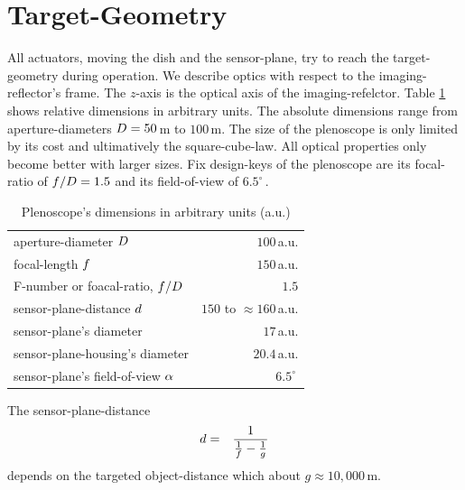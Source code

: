 \documentclass[11pt,a4paper,oneside,titlepage]{article}
\begin{document}
\section{Target-Geometry}
%
All actuators, moving the dish and the sensor-plane, try to reach the target-geometry during operation.
%
We describe optics with respect to the imaging-reflector's frame.
%
The $z$-axis is the optical axis of the imaging-refelctor.
%
Table \ref{TabBasicDimensions} shows relative dimensions in arbitrary units.
%
The absolute dimensions range from aperture-diameters $D = 50\,$m to $100\,$m.
%
The size of the plenoscope is only limited by its cost and ultimatively the square-cube-law.
%
All optical properties only become better with larger sizes.
%
Fix design-keys of the plenoscope are its focal-ratio of $f/D = 1.5$ and its field-of-view of $6.5^\circ\,$.
%
\begin{table}[H]
    \begin{center}
        \begin{tabular}{lr}
            \toprule
            aperture-diameter $D$ & $100\,$a.u.\\
            focal-length $f$ & $150\,$a.u.\\
            F-number or foacal-ratio, $f/D$ & $1.5$\\
            sensor-plane-distance $d$ & $150$ to $\approx 160\,$a.u.\\
            sensor-plane's diameter & $17\,$a.u.\\
            sensor-plane-housing's diameter & $20.4\,$a.u.\\
            sensor-plane's field-of-view $\alpha$ & $6.5^\circ\,$\\
            \bottomrule
        \end{tabular}
        \caption[]{Plenoscope's dimensions in arbitrary units (a.u.)}
        \label{TabBasicDimensions}
    \end{center}
\end{table}
%
The sensor-plane-distance
%
\begin{eqnarray}
d &=& \frac{1}{\frac{1}{f} - \frac{1}{g}}
\end{eqnarray}
%
depends on the targeted object-distance which about $g \approx 10,000\,$m.
%
\end{document}
